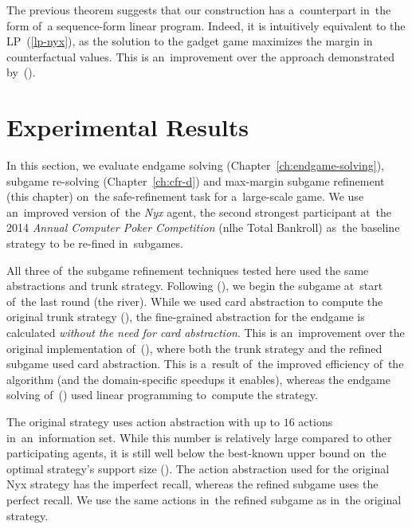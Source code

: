 The previous theorem suggests that our construction has a~counterpart in~the form of~a sequence-form linear program.
Indeed, it is intuitively equivalent to the LP~(\ref{lp-nyx}), as the solution to the gadget game maximizes the margin in counterfactual values.
This is an~improvement over the approach demonstrated by~(\cite{BurchJohansonBowling2014}).

\section{Experimental Results}
\label{sec:max-margin-experiments}
In this section, we evaluate endgame solving (Chapter~\ref{ch:endgame-solving}), subgame re-solving (Chapter~\ref{ch:cfr-d}) and max-margin subgame refinement (this chapter) on~the safe-refinement task for a~large-scale game.
We use an~improved version of~the \emph{Nyx} agent, the second strongest participant at~the 2014 \emph{Annual Computer Poker Competition} (\acrlong{nlhe} Total Bankroll)\footnotemark{} as~the baseline strategy to be re-fined in~subgames.

All three of~the subgame refinement techniques tested here used the same abstractions and trunk strategy.
Following (\cite{Ganzfried2015endgame}), we begin the subgame at~start of~the last round (the river).
While we used card abstraction to compute the original trunk strategy (\cite{Schmid2015automatic, Johanson2013evaluating}), the fine-grained abstraction for the endgame is calculated \emph{without the need for card abstraction}.
This is an~improvement over the original implementation of~(\cite{Ganzfried2015endgame}), where both the trunk strategy and the refined subgame used card abstraction.
This is a~result of~the improved efficiency of~the \cfrplus algorithm (and the domain-specific speedups it enables), whereas the endgame solving of~(\cite{Ganzfried2015endgame}) used linear programming to~compute the strategy.

The original strategy uses action abstraction with up to $16$ actions in~an~information set.
While this number is relatively large compared to other participating agents, it is still well below the best-known upper bound on~the optimal strategy's  support size (\cite{Schmid2014bounding}).
The action abstraction used for the original Nyx strategy has the imperfect recall, whereas the refined subgame uses the perfect recall.
We use the same actions in~the refined subgame as in~the original strategy.

